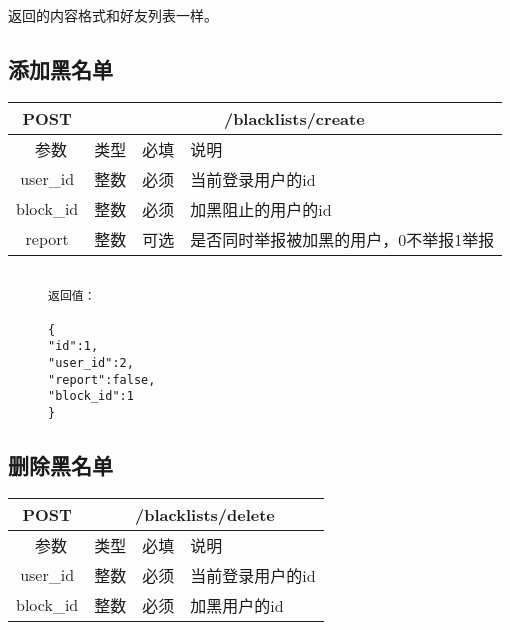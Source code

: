 返回的内容格式和好友列表一样。


\subsection{添加黑名单}

\begin{table}[H]
   \begin{center}
\begin{tabular}{|c|c|c|p{12cm}|}
\hline
POST & \multicolumn{3}{|c|}{/blacklists/create} \\
\hline\hline
 \  参数  & 类型 & 必填 &  说明  \\
\hline
 user\_id  & 整数 & 必须 &  当前登录用户的id\\
\hline
 block\_id  & 整数 & 必须 &  加黑阻止的用户的id\\
 \hline
 report  & 整数 & 可选 &  是否同时举报被加黑的用户，0不举报1举报\\
\hline
\end{tabular}
   \end{center}
\end{table}

\begin{figure}[H]
\begin{verbatim}

返回值：

{
"id":1,
"user_id":2,
"report":false,
"block_id":1
}

\end{verbatim}
\end{figure}



\subsection{删除黑名单}

\begin{table}[H]
   \begin{center}
\begin{tabular}{|c|c|c|p{12cm}|}
\hline
POST & \multicolumn{3}{|c|}{/blacklists/delete} \\
\hline\hline
 \  参数  & 类型 & 必填 &  说明  \\
\hline
 user\_id  & 整数 & 必须 &  当前登录用户的id\\
\hline
 block\_id  & 整数 & 必须 &  加黑用户的id\\
\hline
\end{tabular}
   \end{center}
\end{table}

